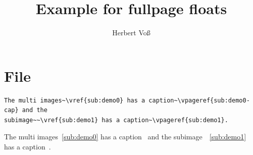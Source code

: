 \documentclass[twoside,twocolumn]{scrartcl}
\begin{document}
\title{Example for fullpage floats}
\author{Herbert Voß}
\maketitle

\tableofcontents

\blinddocument

\section{File \texttt{\jobname}}

\begin{lstlisting}
The multi images~\vref{sub:demo0} has a caption~\vpageref{sub:demo0-cap} and the
subimage~~\vref{sub:demo1} has a caption~\vpageref{sub:demo1}.
\end{lstlisting}

The multi images~\vref{sub:demo0} has a caption~ and the
subimage~~\vref{sub:demo1} has a caption~.
\end{document}
